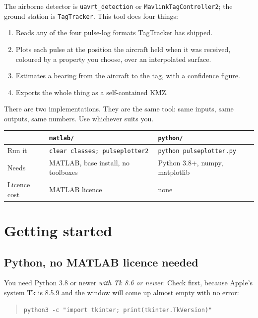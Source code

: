 \documentclass[11pt,a4paper]{article}
\newcommand{\code}[1]{\texttt{\small #1}}
\begin{document}
\noindent The airborne detector is \code{uavrt\_detection} or
\code{MavlinkTagController2}; the ground station is \code{TagTracker}. This
tool does four things:

\begin{enumerate}
\item Reads any of the four pulse-log formats \textsf{TagTracker} has shipped.
\item Plots each pulse at the position the aircraft held when it was received,
      coloured by a property you choose, over an interpolated surface.
\item Estimates a bearing from the aircraft to the tag, with a confidence figure.
\item Exports the whole thing as a self-contained KMZ.
\end{enumerate}

There are two implementations. They are the same tool: same inputs, same
outputs, same numbers. Use whichever suits you.

\begin{center}\small
\begin{tabular}{@{}lll@{}}
\toprule
 & \code{matlab/} & \code{python/} \\
\midrule
Run it        & \code{clear classes; pulseplotter2} & \code{python pulseplotter.py} \\
Needs         & MATLAB, base install, no toolboxes  & Python 3.8+, numpy, matplotlib \\
Licence cost  & MATLAB licence                      & none \\
\bottomrule
\end{tabular}
\end{center}

\section{Getting started}

\subsection{Python, no MATLAB licence needed}

You need Python 3.8 or newer \emph{with Tk 8.6 or newer}. Check first, because
Apple's system Tk is 8.5.9 and the window will come up almost empty with no
error:

\begin{quote}\code{python3 -c "import tkinter; print(tkinter.TkVersion)"}\end{quote}
\end{document}
